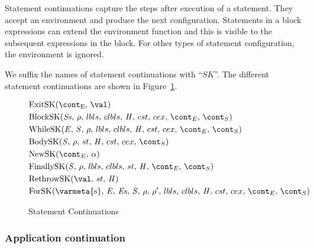 \documentclass{article}
\begin{document}
Statement continuations capture the steps after execution of a statement.
They accept an environment and produce the next configuration.
Statements in a block expressions can extend the environment function and this is visible to the subsequent expressions in the block.
For other types of statement configuration, the environment is ignored.

\noindent
We suffix the names of statement continuations with ``$SK$''.
The different statement continuations are shown in Figure~\ref{figure:sconts}.
\newcommand{\ExitSK}[1]{\mathrm{ExitSK(\econt,\,#1)}}
\newcommand{\BlockSK}[2]{\mathrm{BlockSK}({#1},\,{#2},\,\lbls,\,\clbls,\,\handler,\,\cstrace,\,\cex,\,\econt,\,\scont)}
\newcommand{\WhileSK}{\mathrm{WhileSK}(\expr,\,\stmt,\,\env,\,\lbls,\,\clbls,\,\handler,\,\cstrace,\,\cex,\,\econt,\,\scont)}
\newcommand{\BodySK}[3]{\mathrm{BodySK}({#1},\,{#2},\,\strace,\,\handler,\,\cstrace,\,\cex,\,{#3})}
\newcommand{\NewSK}[2]{\mathrm{NewSK}({#1},\,{#2})}
\newcommand{\FinallySK}[1]{\mathrm{FinallySK}({#1},\,\env,\,\lbls,\,\clbls,\,\strace,\,\handler,\,\econt,\,\scont)}
\newcommand{\RethrowSK}[3]{\mathrm{RethrowSK}({#1},\,{#2},\,{#3})}
%
\newcommand{\ForSK}{\mathrm{ForSK}(\mathrm{\varmeta{s}},\, \expressionmeta,\, \exprs,\, \statementmeta,\, \env,\, \env',\, \lbls,\, \clbls,\, \handler,\, \cstrace,\, \cex,\, \econt,\, \scont)}
\begin{figure}[Htp]
  \begin{align}
	&\ExitSK{\val} \label{scont:exit}\\
	&\BlockSK{\stmts}{\env} \label{scont:block}\\
	&\WhileSK \label{scont:while}\\
	&\BodySK{\stmt}{\env}{\scont} \label{scont:body}\\
	&\NewSK{\econt}{\loc} \label{scont:new}\\
	&\FinallySK{\stmt} \label{scont:finally}\\
	&\RethrowSK{\val}{\strace}{\handler} \label{scont:rethrow}\\
	&\ForSK \label{scont:for}
  \end{align}
  \caption{Statement Continuations}
  \label{figure:sconts}
\end{figure}

\subsubsection{Application continuation}
\label{subsubsec:application-continuation}
\end{document}
